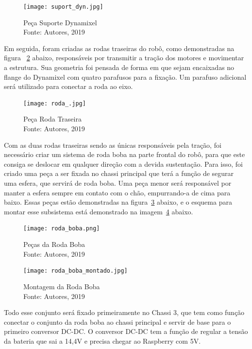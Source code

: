 \begin{figure}[h!]
	\centering
	\texttt{[image: suport\_dyn.jpg]}\\
	\caption{Peça Suporte Dynamixel \\ Fonte: Autores, 2019}
	\label{fig:suport_dyn}
\end{figure}

Em seguida, foram criadas as rodas traseiras do robô, como demonstradas na figura ~\ref{fig:roda_} abaixo, responsáveis por transmitir a tração dos motores e movimentar a estrutura. Sua geometria foi pensada de forma em que sejam encaixadas no flange do Dynamixel com quatro parafusos para a fixação. Um parafuso adicional será utilizado para conectar a roda ao eixo.

\begin{figure}[h!]
	\centering
	\texttt{[image: roda\_.jpg]}\\
	\caption{Peça Roda Traseira \\ Fonte: Autores, 2019}
	\label{fig:roda_}
\end{figure}

Com as duas rodas traseiras sendo as únicas responsáveis pela tração, foi necessário criar um sistema de roda boba na parte frontal do robô, para que este consiga se deslocar em qualquer direção com a devida sustentação. Para isso, foi criado uma peça
a ser fixada no chassi principal que terá a função de segurar uma esfera, que servirá de roda boba. Uma peça menor será responsável por manter a esfera sempre em contato com o chão, empurrando-a de cima para baixo. Essas peças estão demonstradas na figura~\ref{fig:roda_boba} abaixo, e o esquema para montar esse subsistema está demonstrado na imagem~\ref{fig:roda_boba_montado} abaixo.

\begin{figure}[h!]
	\centering
	\texttt{[image: roda\_boba.png]}\\
	\caption{Peças da Roda Boba \\ Fonte: Autores, 2019}
	\label{fig:roda_boba}
\end{figure}

\begin{figure}[h!]
	\centering
	\texttt{[image: roda\_boba\_montado.jpg]}\\
	\caption{Montagem da Roda Boba \\ Fonte: Autores, 2019}
	\label{fig:roda_boba_montado}
\end{figure}

Todo esse conjunto será fixado primeiramente no Chassi 3, que tem como função conectar o conjunto da roda boba ao chassi principal e servir de base para o primeiro conversor DC-DC. O conversor DC-DC tem a função de regular a tensão da bateria que sai a 14,4V e precisa chegar ao Raspberry com 5V.

